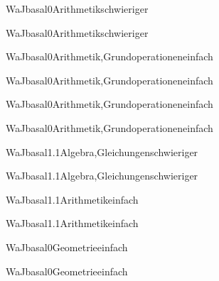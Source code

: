 \documentclass[12pt]{article}
\begin{document}
    \begin{Add}{WaJ}{basal0}{Arithmetik}{schwieriger}
    \solution{ }
    \end{Add}
    \begin{Add}{WaJ}{basal0}{Arithmetik}{schwieriger}
    \end{Add}
    

\begin{Add}{WaJ}{basal0}{Arithmetik,Grundoperationen}{einfach}
\solution{ }
\end{Add}
\begin{Add}{WaJ}{basal0}{Arithmetik,Grundoperationen}{einfach}
\end{Add}

\begin{Add}{WaJ}{basal0}{Arithmetik,Grundoperationen}{einfach}
\solution{ }
\end{Add}
\begin{Add}{WaJ}{basal0}{Arithmetik,Grundoperationen}{einfach}
\end{Add}

\begin{Add}{WaJ}{basal1.1}{Algebra,Gleichungen}{schwieriger}
\solution{ }
\end{Add}
\begin{Add}{WaJ}{basal1.1}{Algebra,Gleichungen}{schwieriger}
\end{Add}

\begin{Add}{WaJ}{basal1.1}{Arithmetik}{einfach}
\solution{ }
\end{Add}
\begin{Add}{WaJ}{basal1.1}{Arithmetik}{einfach}
\end{Add}

\begin{Add}{WaJ}{basal0}{Geometrie}{einfach}
\solution{ }
\end{Add}
\begin{Add}{WaJ}{basal0}{Geometrie}{einfach}
\end{Add}
\end{document}
